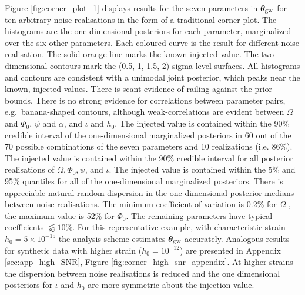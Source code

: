 \documentclass[fleqn,usenatbib,useAMS]{mnras}
\begin{document}
Figure \ref{fig:corner_plot_1} displays results for the seven parameters in $\boldsymbol{\theta}_{\rm gw}$ for ten arbitrary noise realisations in the form of a traditional corner plot. The histograms are the one-dimensional posteriors for each parameter, marginalized over the six other parameters. Each coloured curve is the result for different noise realisation. The solid orange line marks the known injected value. The two-dimensional contours mark the (0.5, 1, 1.5, 2)-sigma level surfaces. All histograms and contours are consistent with a unimodal joint posterior, which peaks near the known, injected values. There is scant evidence of railing against the prior bounds. There is no strong evidence for correlations between parameter pairs, e.g.\ banana-shaped contours, although weak-correlations are evident between $\Omega$ and $\Phi_0$, $\psi$ and $\alpha$, and $\iota$ and $h_0$. The injected value is contained within the 90\% credible interval of the one-dimensional marginalized posteriors in 60 out of the 70 possible combinations of the seven parameters and 10 realizations (i.e. 86$\%$). The injected value is contained within the 90\% credible interval for all posterior realisations of $\Omega, \Phi_0, \psi$, and  $\iota$. The injected value is contained within the 5\% and 95\% quantiles for all of the one-dimensional marginalized posteriors. There is appreciable natural random dispersion in the one-dimensional posterior medians between noise realisations. The minimum coefficient of variation is  0.2\% for $\Omega$ , the maximum value is 52\% for $\Phi_0$. The remaining parameters have typical coefficients $\lessapprox 10 \%$. For this representative example, with characteristic strain $h_0 = 5 \times 10^{-15}$ the analysis scheme estimates $\boldsymbol{\theta}_{\rm gw}$ accurately. Analogous results for synthetic data with higher strain ($h_0 = 10^{-12}$) are presented in Appendix \ref{sec:app_high_SNR}, Figure \ref{fig:corner_high_snr_appendix}. At higher strains the dispersion between noise realisations is reduced and the one dimensional posteriors for $\iota$ and $h_0$ are more symmetric about the injection value. \newline 
\end{document}
